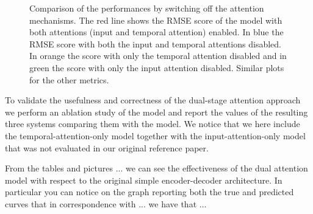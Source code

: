 \documentclass{article}
\begin{document}
\begin{figure}[h]
  \centering
  \caption{Comparison of the performances by switching off the attention
  mechanisms. The red line shows the RMSE score of the model with both
  attentions (input and temporal attention) enabled. In blue the RMSE score
  with both the input and temporal attentions disabled. In orange the score
  with only the temporal attention disabled and in green the score with
  only the input attention disabled. Similar plots for the other metrics.}
\end{figure}

To validate the usefulness and correctness of the dual-stage attention approach we
perform an ablation study of the model and report the values of the resulting 
three systems comparing them with the model. We notice that we here include the 
temporal-attention-only model together with the input-attention-only model that
was not evaluated in our original reference paper.

From the tables and pictures ...
we can see the effectiveness of the dual attention model with respect to the 
original simple encoder-decoder architecture. In particular you can notice on 
the graph reporting both the true and predicted curves that in correspondence 
with ... we have that ...
\end{document}
